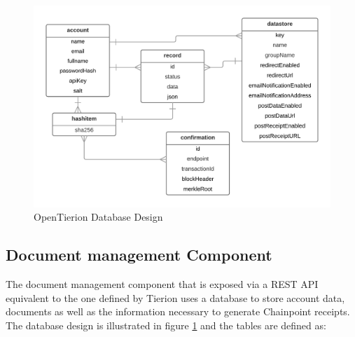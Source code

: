 \documentclass[12pt,msc,a4paper,oneside]{ucl_thesis}
\begin{document}
\begin{figure}
    \includegraphics[width=1.0\textwidth]{./figures/tierion_db.png}
    \caption{OpenTierion Database Design}
    \label{fig:tierion_database_design}
\end{figure}

\subsection{Document management Component}
The document management component that is exposed via a REST API equivalent to the one defined by Tierion uses a database to store account data, documents as well as the information necessary to generate Chainpoint receipts. The database design is illustrated in figure \ref{fig:tierion_database_design} and the tables are defined as:
\end{document}
